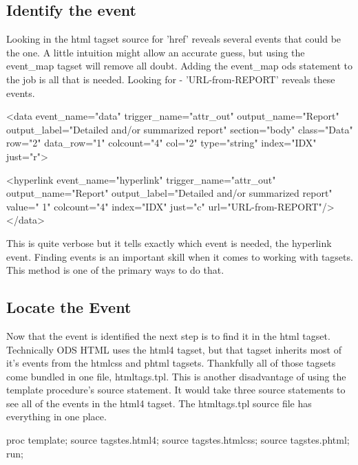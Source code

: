 \subsection{Identify the event}
Looking in the html tagset source for 'href' reveals several events that could
be the one.  A little intuition might allow an accurate guess, 
but using the event\_map tagset will remove all doubt.
Adding the event\_map ods statement to the job is all that is needed.
Looking for - 'URL-from-REPORT' reveals these events.

\begin{sfvoutput} 
<data event_name="data" trigger_name="attr_out" output_name="Report" 
      output_label="Detailed and/or summarized report" 
      section="body" class="Data" row="2" data_row="1" 
      colcount="4" col="2" type="string" index="IDX" just="r">

  <hyperlink event_name="hyperlink" trigger_name="attr_out" 
              output_name="Report" 
              output_label="Detailed and/or summarized report" 
              value="        1" colcount="4" index="IDX" 
              just="c" url="URL-from-REPORT"/>
</data>
\end{sfvoutput} 

This is quite verbose but it tells exactly which event is needed, the hyperlink
event.  Finding events is an important skill
when it comes to working with tagsets.  This method is one of the primary
ways to do that.

\subsection{Locate the Event}
Now that the event is identified the next step is to find it
in the html tagset.  Technically ODS HTML uses the html4 tagset, but that
tagset inherits most of it's events from the htmlcss and phtml tagsets.
Thankfully all of those tagsets come bundled in one file, htmltags.tpl.
This is another disadvantage of using the template procedure's source
statement.  It would take three source statements to see all of the events
in the html4 tagset.  The htmltags.tpl source file has everything in one place.

\begin{sfvcode}
   proc template;
   source tagstes.html4;
   source tagstes.htmlcss;
   source tagstes.phtml;
   run;
\end{sfvcode}

